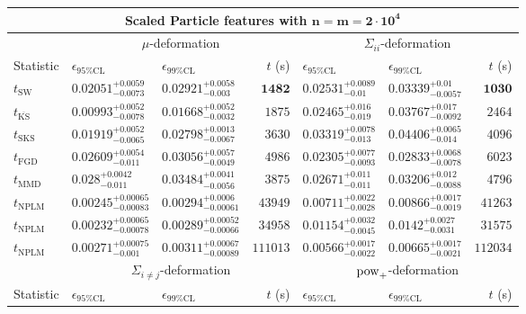 \begin{tabular}{l|llr|llr}
	\toprule
	\multicolumn{7}{c}{{\bf Scaled Particle features with $\mathbf{n=m=2\cdot 10^{4}}$}} \\
	\toprule
	\multicolumn{1}{c}{} & \multicolumn{3}{c}{$\mu$-deformation} & \multicolumn{3}{c}{$\Sigma_{ii}$-deformation} \\
	Statistic & $\epsilon_{95\%\mathrm{CL}}$ & $\epsilon_{99\%\mathrm    {CL}}$ & $t$ (s) & $\epsilon_{95\%\mathrm{CL}}$ & $\epsilon_{99\%\mathrm{CL}}$ & $t$ (s) \\
	\midrule
	$t_{\mathrm{SW}}$ & $0.02051_{-0.0073}^{+0.0059}$ & $0.02921_{-0.003}^{+0.0058}$ & ${\mathbf{1482}}$ & $0.02531_{-0.01}^{+0.0089}$ & $0.03339_{-0.0057}^{+0.01}$ & ${\mathbf{1030}}$ \\
	$t_{\overline{\mathrm{KS}}}$ & ${\mathbf{0.00993_{-0.0078}^{+0.0052}}}$ & ${\mathbf{0.01668_{-0.0032}^{+0.0052}}}$ & $1875$ & $0.02465_{-0.019}^{+0.016}$ & $0.03767_{-0.0092}^{+0.017}$ & $2464$ \\
	$t_{\mathrm{SKS}}$ & $0.01919_{-0.0065}^{+0.0052}$ & $0.02798_{-0.0067}^{+0.0013}$ & $3630$ & $0.03319_{-0.013}^{+0.0078}$ & $0.04406_{-0.014}^{+0.0065}$ & $4096$ \\
	$t_{\mathrm{FGD}}$ & $0.02609_{-0.011}^{+0.0054}$ & $0.03056_{-0.0049}^{+0.0057}$ & $4986$ & ${\mathbf{0.02305_{-0.0093}^{+0.0077}}}$ & ${\mathbf{0.02833_{-0.0078}^{+0.0068}}}$ & $6023$ \\
	$t_{\mathrm{MMD}}$ & $0.028_{-0.011}^{+0.0042}$ & $0.03484_{-0.0056}^{+0.0041}$ & $3875$ & $0.02671_{-0.011}^{+0.011}$ & $0.03206_{-0.0088}^{+0.012}$ & $4796$ \\
\rowcolor{red!35}	$t_{\mathrm{NPLM}}$ & $0.00245_{-0.00083}^{+0.00065}$ & $0.00294_{-0.00061}^{+0.0006}$ & $43949$ & $0.00711_{-0.0028}^{+0.0022}$ & $0.00866_{-0.0019}^{+0.0017}$ & $41263$ \\
\rowcolor{blue!35}	$t_{\mathrm{NPLM}}$ & $0.00232_{-0.00078}^{+0.00065}$ & $0.00289_{-0.00066}^{+0.00052}$ & $34958$ & $0.01154_{-0.0045}^{+0.0032}$ & $0.0142_{-0.0031}^{+0.0027}$ & $31575$ \\
\rowcolor{green!35}	$t_{\mathrm{NPLM}}$ & $0.00271_{-0.001}^{+0.00075}$ & $0.00311_{-0.00089}^{+0.00067}$ & $111013$ & $0.00566_{-0.0022}^{+0.0017}$ & $0.00665_{-0.0021}^{+0.0017}$ & $112034$ \\
	\toprule
	\multicolumn{1}{c}{} & \multicolumn{3}{c}{$\Sigma_{i\neq j}$-deformation} & \multicolumn{3}{c}{$\rm{pow}_{+}$-deformation} \\
Statistic & $\epsilon_{95\%\mathrm{CL}}$ & $\epsilon_{99\%\mathrm{CL}}$ & $t$ (s) & $\epsilon_{95\%\mathrm{CL}}$ & $\epsilon_{99\%\mathrm{CL}}$ & $t$ (s) \\

\end{tabular}
